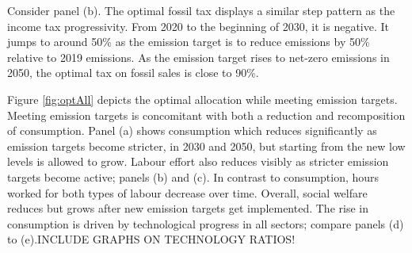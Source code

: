 Consider panel (b). The optimal fossil tax displays a similar step pattern as the income tax progressivity. From 2020 to the beginning of 2030, it is negative. It jumps to around 50\% as the emission target is to reduce emissions by 50\% relative to 2019 emissions. As the emission target rises  to net-zero emissions in 2050, the optimal tax on fossil sales is close to 90\%. 

Figure \ref{fig:optAll} depicts the optimal allocation while meeting emission targets.
Meeting emission targets is concomitant with both a reduction and recomposition of consumption. Panel (a) shows consumption which reduces significantly as emission targets become stricter, in 2030 and 2050, but starting from the new low levels is allowed to grow. Labour effort also reduces visibly as stricter emission targets become active; panels (b) and (c). In contrast to consumption, hours worked for both types of labour decrease over time. Overall, social welfare reduces but grows after new emission targets get implemented. The rise in consumption is driven by technological progress in all sectors; compare panels (d) to (e).INCLUDE GRAPHS ON TECHNOLOGY RATIOS!

